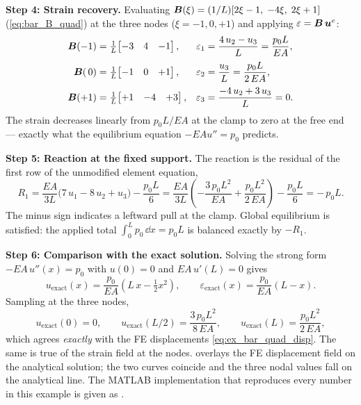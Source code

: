 \begin{example}
\medskip
\noindent\textbf{Step 4: Strain recovery.}
Evaluating $\bm{B}(\xi) = (1/L)[2\xi-1,\;-4\xi,\;2\xi+1]$
(\cref{eq:bar_B_quad}) at the three nodes ($\xi = -1, 0, +1$) and
applying $\varepsilon = \bm{B}\,\bm{u}^e$:
\begin{align*}
    \bm{B}(-1) &= \tfrac{1}{L}\!\begin{bmatrix} -3 & 4 & -1 \end{bmatrix}, &
    \varepsilon_1 &= \frac{4\,u_2 - u_3}{L}
                  = \frac{p_0 L}{EA},\\[2pt]
    \bm{B}(\,0) &= \tfrac{1}{L}\!\begin{bmatrix} -1 & 0 & +1 \end{bmatrix}, &
    \varepsilon_2 &= \frac{u_3}{L}
                  = \frac{p_0 L}{2\,EA},\\[2pt]
    \bm{B}(+1) &= \tfrac{1}{L}\!\begin{bmatrix} +1 & -4 & +3 \end{bmatrix}, &
    \varepsilon_3 &= \frac{-4\,u_2 + 3\,u_3}{L} = 0 .
\end{align*}
The strain decreases linearly from $p_0 L/EA$ at the clamp to zero at
the free end --- exactly what the equilibrium equation $-EA u'' = p_0$
predicts.

\medskip
\noindent\textbf{Step 5: Reaction at the fixed support.}
The reaction is the residual of the first row of the unmodified
element equation,
\begin{equation*}
    R_1
    = \frac{EA}{3L}\bigl(7\,u_1 - 8\,u_2 + u_3\bigr) - \frac{p_0 L}{6}
    = \frac{EA}{3L}\!\left(
            -\frac{3\,p_0 L^2}{EA} + \frac{p_0 L^2}{2\,EA}
        \right) - \frac{p_0 L}{6}
    = -\,p_0 L .
\end{equation*}
The minus sign indicates a leftward pull at the clamp. Global
equilibrium is satisfied: the applied total $\int_0^{L}\!p_0\,\dd x = p_0 L$
is balanced exactly by $-R_1$.

\medskip
\noindent\textbf{Step 6: Comparison with the exact solution.}
Solving the strong form $-EA\,u''(x) = p_0$ with $u(0)=0$ and
$EA\,u'(L)=0$ gives
\begin{equation}
    u_{\text{exact}}(x) = \frac{p_0}{EA}\!\left(L\,x - \tfrac{1}{2}x^2\right),
    \qquad
    \varepsilon_{\text{exact}}(x) = \frac{p_0}{EA}(L - x) .
    \label{eq:ex_bar_quad_exact}
\end{equation}
Sampling at the three nodes,
\[
    u_{\text{exact}}(0) = 0, \qquad
    u_{\text{exact}}(L/2) = \frac{3\,p_0 L^2}{8\,EA}, \qquad
    u_{\text{exact}}(L) = \frac{p_0 L^2}{2\,EA},
\]
which agrees \emph{exactly} with the FE displacements
\cref{eq:ex_bar_quad_disp}. The same is true of the strain field at the
nodes.  overlays the FE displacement field
on the analytical solution; the two curves coincide and the three nodal
values fall on the analytical line. The MATLAB implementation that
reproduces every number in this example is given as
.


\end{example}
